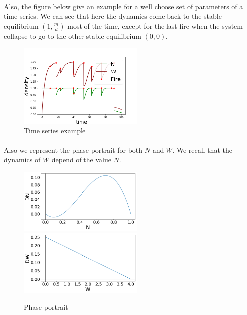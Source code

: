 \documentclass{article}
\begin{document}
\paragraph{}
Also, the figure below give an example for a well choose set of parameters of a time series. We can see that here the dynamics come back to the stable equilibrium $(1, \frac{m}{d})$ most of the time, except for the last fire when the system collapse to go to the other stable equilibrium $(0, 0)$. 

\begin{figure}[h!]
\centering
\includegraphics[width=6cm]{return_between_2.png}
\caption{Time series example}
\end{figure}

\newpage
\paragraph{}
Also we represent the phase portrait for both $N$ and $W$. We recall that the dynamics of $W$ depend of the value $N$. 

\begin{figure}[h!]
\centering
\includegraphics[width=6cm]{phase_N.png}
\includegraphics[width=6cm]{phase_W.png}
\caption{Phase portrait}
\end{figure}
\end{document}
